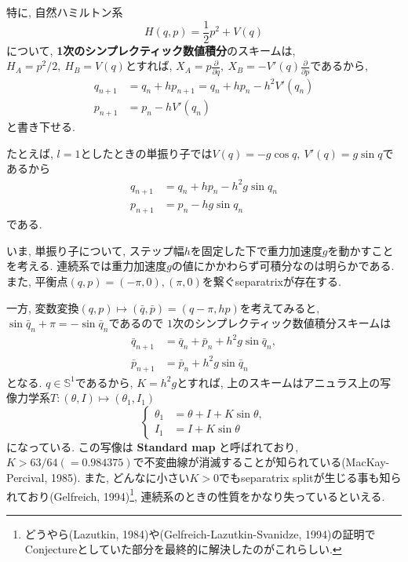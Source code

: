 \documentclass[a4paper]{ujarticle}
\numberwithin{equation}{section}
\theoremstyle{definition}
\begin{document}
    特に, 自然ハミルトン系
    \[
        H(q, p) = \frac{1}{2} p^2 + V(q)
    \]
    について, \textbf{1次のシンプレクティック数値積分}のスキームは, $H_A = p^2/2, \ H_{B} = V(q)$とすれば,
    $\displaystyle X_{A} = p \frac{\partial}{\partial q}, \ X_B = - V'(q) \frac{\partial}{\partial p}$であるから,
    \begin{align}
        q_{n+1} &= q_n + h p_{n+1} = q_{n} + h p_{n} - h^2 V'(q_n) \\
        p_{n+1} &= p_{n} - h V'(q_n)
    \end{align}
    と書き下せる.

    たとえば, $l = 1$としたときの単振り子では$V(q) = - g \cos{q}, \ V'(q) = g \sin{q}$であるから
    \begin{align}
        q_{n+1} &= q_{n} + h p_{n} - h^2 g \sin{q_{n}} \\
        p_{n+1} &= p_{n} - h g \sin{q_{n}}
    \end{align}
    である.

    いま, 単振り子について, ステップ幅$h$を固定した下で重力加速度$g$を動かすことを考える.
    連続系では重力加速度$g$の値にかかわらず可積分なのは明らかである. 
    また, 平衡点$(q, p) = (- \pi , 0), (\pi, 0)$を繋ぐseparatrixが存在する.
    
    一方, 変数変換$(q, p) \mapsto (\bar{q}, \bar{p}) = (q - \pi, h p)$を考えてみると, 
    $\sin{\bar{q}_{n} + \pi} = - \sin{\bar{q}_{n}}$であるので
    $1$次のシンプレクティック数値積分スキームは
    \begin{align}
        \bar{q}_{n+1} &= \bar{q}_{n} + \bar{p}_{n} +  h^2 g \sin{\bar{q}_{n}}, \\
        \bar{p}_{n+1} &= \bar{p}_{n} + h^2 g \sin{\bar{q}_{n}}
    \end{align}
    となる. $q \in \mathbb{S}^1$であるから, 
    $K = h^2 g$とすれば, 上のスキームはアニュラス上の写像力学系$T: (\theta, I) \mapsto (\theta_1, I_1)$
    \begin{equation}
        \left\{
        \begin{aligned}
            \theta_1 &= \theta + I + K \sin{\theta}, \\
            I_1 &= I + K \sin{\theta}
        \end{aligned}
        \right.
    \end{equation}
    になっている. 
    この写像は \textbf{Standard map} と呼ばれており, $K > 63/64 (= 0.984375)$で不変曲線が消滅することが知られている(MacKay-Percival, 1985).
    また, どんなに小さい$K > 0$でもseparatrix splitが生じる事も知られており(Gelfreich, 1994)\footnote{どうやら(Lazutkin, 1984)や(Gelfreich-Lazutkin-Svanidze, 1994)の証明でConjectureとしていた部分を最終的に解決したのがこれらしい.},
    連続系のときの性質をかなり失っているといえる.
    
\end{document}
